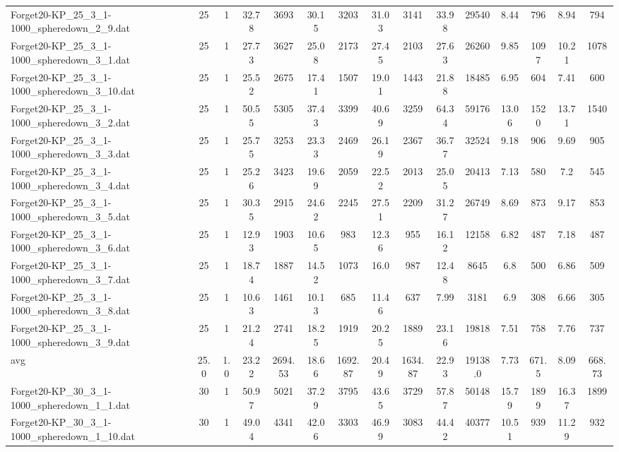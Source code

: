 \begin{table}[!ht]
{\begin{tabular}{lcccccccccccccc}
Forget20-KP\_25\_3\_1-1000\_spheredown\_2\_9.dat & 25 & 1 & 32.78 & 3693 & 30.15 & 3203 & 31.03 & 3141 & 33.98 & 29540 & 8.44 & 796 & 8.94 & 794 \\
Forget20-KP\_25\_3\_1-1000\_spheredown\_3\_1.dat & 25 & 1 & 27.73 & 3627 & 25.08 & 2173 & 27.45 & 2103 & 27.63 & 26260 & 9.85 & 1097 & 10.21 & 1078 \\
Forget20-KP\_25\_3\_1-1000\_spheredown\_3\_10.dat & 25 & 1 & 25.52 & 2675 & 17.41 & 1507 & 19.01 & 1443 & 21.88 & 18485 & 6.95 & 604 & 7.41 & 600 \\
Forget20-KP\_25\_3\_1-1000\_spheredown\_3\_2.dat & 25 & 1 & 50.55 & 5305 & 37.43 & 3399 & 40.69 & 3259 & 64.34 & 59176 & 13.06 & 1520 & 13.71 & 1540 \\
Forget20-KP\_25\_3\_1-1000\_spheredown\_3\_3.dat & 25 & 1 & 25.75 & 3253 & 23.33 & 2469 & 26.19 & 2367 & 36.77 & 32524 & 9.18 & 906 & 9.69 & 905 \\
Forget20-KP\_25\_3\_1-1000\_spheredown\_3\_4.dat & 25 & 1 & 25.26 & 3423 & 19.69 & 2059 & 22.52 & 2013 & 25.05 & 20413 & 7.13 & 580 & 7.2 & 545 \\
Forget20-KP\_25\_3\_1-1000\_spheredown\_3\_5.dat & 25 & 1 & 30.35 & 2915 & 24.62 & 2245 & 27.51 & 2209 & 31.27 & 26749 & 8.69 & 873 & 9.17 & 853 \\
Forget20-KP\_25\_3\_1-1000\_spheredown\_3\_6.dat & 25 & 1 & 12.93 & 1903 & 10.65 & 983 & 12.36 & 955 & 16.12 & 12158 & 6.82 & 487 & 7.18 & 487 \\
Forget20-KP\_25\_3\_1-1000\_spheredown\_3\_7.dat & 25 & 1 & 18.74 & 1887 & 14.52 & 1073 & 16.0 & 987 & 12.48 & 8645 & 6.8 & 500 & 6.86 & 509 \\
Forget20-KP\_25\_3\_1-1000\_spheredown\_3\_8.dat & 25 & 1 & 10.63 & 1461 & 10.13 & 685 & 11.46 & 637 & 7.99 & 3181 & 6.9 & 308 & 6.66 & 305 \\
Forget20-KP\_25\_3\_1-1000\_spheredown\_3\_9.dat & 25 & 1 & 21.24 & 2741 & 18.25 & 1919 & 20.25 & 1889 & 23.16 & 19818 & 7.51 & 758 & 7.76 & 737 \\
\hline avg & 25.0 & 1.0 & 23.22& 2694.53 & 18.66& 1692.87 & 20.49& 1634.87 & 22.93& 19138.0 & 7.73& 671.5 & 8.09& 668.73\\ \hline
Forget20-KP\_30\_3\_1-1000\_spheredown\_1\_1.dat & 30 & 1 & 50.97 & 5021 & 37.29 & 3795 & 43.65 & 3729 & 57.87 & 50148 & 15.79 & 1899 & 16.37 & 1899 \\
Forget20-KP\_30\_3\_1-1000\_spheredown\_1\_10.dat & 30 & 1 & 49.04 & 4341 & 42.06 & 3303 & 46.99 & 3083 & 44.42 & 40377 & 10.51 & 939 & 11.29 & 932 \\

\end{tabular}}
\end{table}
